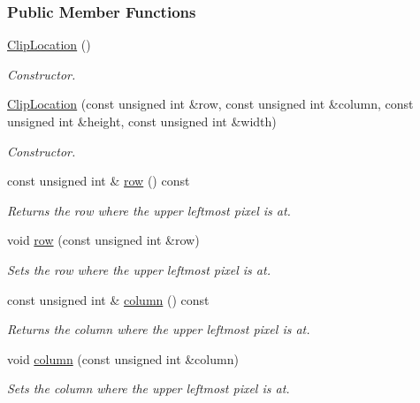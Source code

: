 \subsubsection*{Public Member Functions}
\begin{CompactItemize}
\item 
\hyperlink{class_clip_location_fb51ec03e0a8f9b33f4d785550bc6b84}{ClipLocation} ()
\begin{CompactList}\small\item\em Constructor. \item\end{CompactList}\item 
\hyperlink{class_clip_location_b41ff36c161d2d909c6e75474f5f2f31}{ClipLocation} (const unsigned int \&row, const unsigned int \&column, const unsigned int \&height, const unsigned int \&width)
\begin{CompactList}\small\item\em Constructor. \item\end{CompactList}\item 
const unsigned int \& \hyperlink{class_clip_location_8816c925e80c2e55bbbbdd6da799f53f}{row} () const 
\begin{CompactList}\small\item\em Returns the row where the upper leftmost pixel is at. \item\end{CompactList}\item 
void \hyperlink{class_clip_location_5a95f9fae24adf0b6d227714b9b69e2e}{row} (const unsigned int \&row)
\begin{CompactList}\small\item\em Sets the row where the upper leftmost pixel is at. \item\end{CompactList}\item 
const unsigned int \& \hyperlink{class_clip_location_50409bab2a256787fcc59e5d213d6a58}{column} () const 
\begin{CompactList}\small\item\em Returns the column where the upper leftmost pixel is at. \item\end{CompactList}\item 
void \hyperlink{class_clip_location_321238ca06a98bcce5f5292c1ea3e6c0}{column} (const unsigned int \&column)
\begin{CompactList}\small\item\em Sets the column where the upper leftmost pixel is at. \item\end{CompactList}\item 

\end{CompactItemize}
